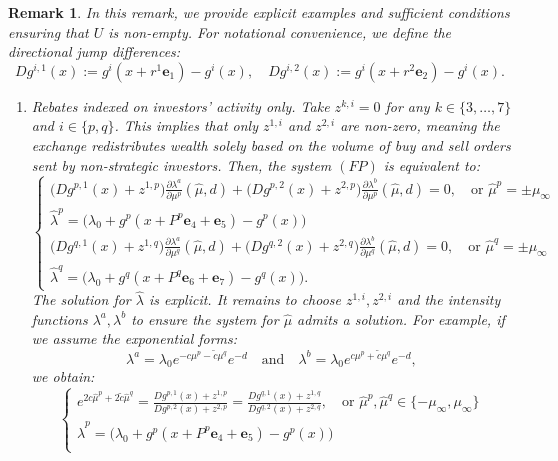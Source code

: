 \documentclass[12pt]{article}
\newtheorem{remark}[theorem2]{Remark}
\begin{document}
\begin{remark}\label{rem:Ucharacterization} 
In this remark, we provide explicit examples and sufficient conditions ensuring that $U$ is non-empty. For notational convenience, we define the directional jump differences:
\[ Dg^{i,1}(x) := g^i(x + r^1 \mathbf{e}_1) - g^i(x), \quad Dg^{i,2}(x) := g^i(x + r^2 \mathbf{e}_2) - g^i(x). \]

\begin{enumerate}
    \item \textit{Rebates indexed on investors' activity only.} 
    Take $z^{k,i} = 0$ for any $k \in \{3,\dots,7\}$ and $i \in \{p,q\}$. This implies that only $z^{1,i}$ and $z^{2,i}$ are non-zero, meaning the exchange redistributes wealth solely based on the volume of buy and sell orders sent by non-strategic investors. Then, the system $(FP)$ is equivalent to:
    \[ 
    \begin{cases}
    \big( Dg^{p,1}(x)+z^{1,p} \big) \frac{\partial{\lambda^a}}{\partial \mu^p} (\hat{\mu},d) + \big( Dg^{p,2}(x)+z^{2,p} \big) \frac{\partial{\lambda^b}}{\partial \mu^p}(\hat{\mu},d) = 0, \quad \text{or } \hat{\mu}^p = \pm \mu_{\infty} \\
    \hat{\lambda}^p = \big( \lambda_0 + g^p(x + P^p\mathbf{e}_4 + \mathbf{e}_5) - g^p(x) \big) \\
    \big( Dg^{q,1}(x)+z^{1,q} \big) \frac{\partial{\lambda^a}}{\partial \mu^q} (\hat{\mu},d) + \big( Dg^{q,2}(x)+z^{2,q} \big) \frac{\partial{\lambda^b}}{\partial \mu^q}(\hat{\mu},d) = 0, \quad \text{or } \hat{\mu}^q = \pm \mu_{\infty} \\
    \hat{\lambda}^q = \big( \lambda_0 + g^q(x + P^q\mathbf{e}_6 + \mathbf{e}_7) - g^q(x) \big).
    \end{cases}
    \]
    The solution for $\hat{\lambda}$ is explicit. It remains to choose $z^{1,i}, z^{2,i}$ and the intensity functions $\lambda^a, \lambda^b$ to ensure the system for $\hat{\mu}$ admits a solution. For example, if we assume the exponential forms:
    \[\lambda^a = \lambda_0 e^{-c\mu^p - \tilde{c}\mu^q} e^{-d} \quad \text{and} \quad \lambda^b = \lambda_0 e^{c\mu^p + \tilde{c} \mu^q}e^{-d},\] 
    we obtain:
    \[ 
    \begin{cases}
    e^{2c\hat{\mu}^p + 2\tilde{c}\hat{\mu}^q} = \frac{Dg^{p,1}(x)+z^{1,p}}{Dg^{p,2}(x)+z^{2,p}} = \frac{Dg^{q,1}(x)+z^{1,q}}{Dg^{q,2}(x)+z^{2,q}}, \quad \text{or } \hat{\mu}^p, \hat{\mu}^q \in \{-\mu_{\infty}, \mu_{\infty}\} \\
    \hat{\lambda}^p = \big( \lambda_0 + g^p(x + P^p\mathbf{e}_4 + \mathbf{e}_5) - g^p(x) \big) \\

\end{cases}\]
\end{enumerate}
\end{remark}
\end{document}
